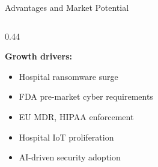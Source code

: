 \documentclass[10pt, aspectratio=169]{beamer}
\begin{document}
\begin{frame}{Advantages and Market Potential}
\begin{columns}[T]
\begin{column}{0.44\textwidth}
\begin{table}
      \end{table}
      \vspace{4pt}
      {\footnotesize\textbf{Growth drivers:}
      \begin{itemize}\scriptsize
        \item Hospital ransomware surge
        \item FDA pre-market cyber requirements
        \item EU MDR, HIPAA enforcement
        \item Hospital IoT proliferation
        \item AI-driven security adoption
      \end{itemize}}
    \end{column}
  \end{columns}
\end{frame}
\end{document}
